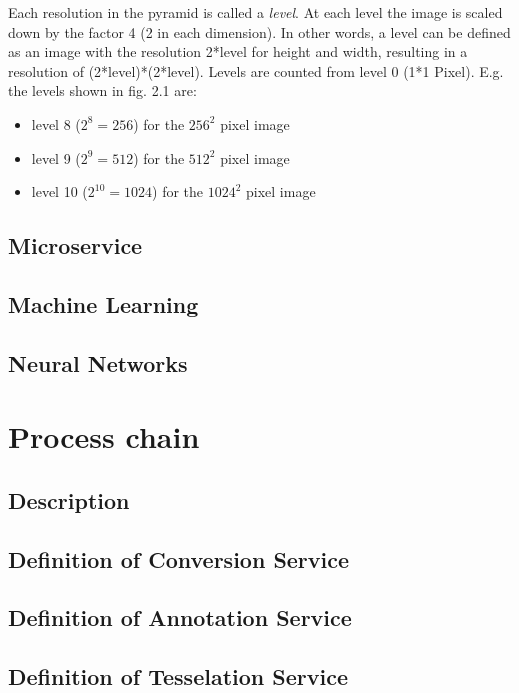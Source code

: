 			Each resolution in the pyramid is called a \emph{level}. At each level the
			image is scaled down by the factor 4 (2 in each dimension). In other words, a
			level can be defined as an image with the resolution 2*level for height and
			width, resulting in a resolution of (2*level)*(2*level). Levels are counted
			from level 0 (1*1 Pixel). E.g. the levels shown in fig. 2.1 are:
			\begin{itemize}
			  \item level 8 ($2^8=256$) for the $256^2$ pixel image
			  \item level 9 ($2^9=512$) for the $512^2$ pixel image
			  \item level 10 ($2^10=1024$) for the $1024^2$ pixel image
			\end{itemize}

\subsection{Microservice}
\subsection{Machine Learning}
\subsection{Neural Networks}
\section{Process chain}
\subsection{Description}
\subsection{Definition of Conversion Service}
\subsection{Definition of Annotation Service}
\subsection{Definition of Tesselation Service}